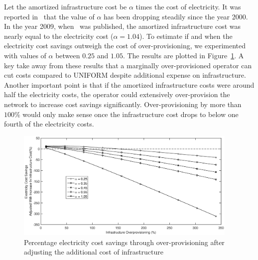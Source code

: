 Let the amortized infrastructure cost be $\alpha$ times the cost of electricity. It was reported in~\cite{qureshiHotnets} that the value of $\alpha$ has been dropping steadily since the year 2000. In the year 2009, when~\cite{qureshiHotnets} was published, the amortized infrastructure cost was nearly equal to the electricity cost ($\alpha = 1.04$). To estimate if and when the electricity cost savings outweigh the cost of over-provisioning, we experimented with values of $\alpha$ between $0.25$ and $1.05$. The results are plotted in Figure~\ref{fig:newresults1}. A key take away from these results that a marginally over-provisioned operator can cut costs compared to UNIFORM despite additional expense on infrastructure. Another important point is that if the amortized infrastructure costs were around half the electricity costs, the operator could extensively over-provision the network to increase cost savings significantly. Over-provisioning by more than $100\%$ would only make sense once the infrastructure cost drops to below one fourth of the electricity costs.

\begin{figure}
\centering
\includegraphics[width=0.95\textwidth]{pics/RED-BLnewResults.eps}
    \caption{Percentage electricity cost savings through over-provisioning after adjusting the additional cost of infrastructure}
    \label{fig:newresults1}
\end{figure}

